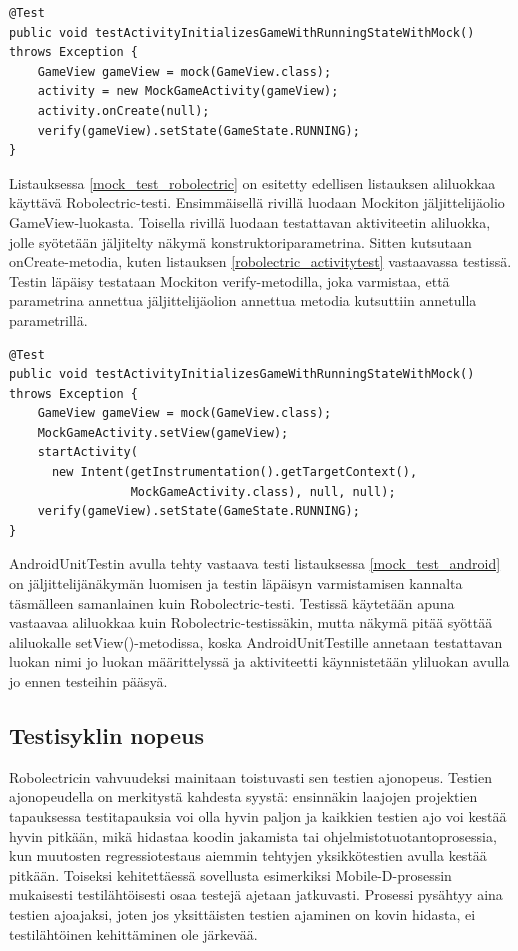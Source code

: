\begin{lstlisting}[float,label=mock_test_robolectric, caption=Jäljittelyä käyttävä testi Robolectrcicillä]
@Test
public void testActivityInitializesGameWithRunningStateWithMock() throws Exception {
	GameView gameView = mock(GameView.class);
	activity = new MockGameActivity(gameView);
	activity.onCreate(null);
	verify(gameView).setState(GameState.RUNNING);
}
\end{lstlisting}

Listauksessa \ref{mock_test_robolectric} on esitetty edellisen listauksen aliluokkaa käyttävä Robolectric-testi. Ensimmäisellä rivillä luodaan Mockiton jäljittelijäolio GameView-luokasta. Toisella rivillä luodaan testattavan aktiviteetin aliluokka, jolle syötetään jäljitelty näkymä konstruktoriparametrina. Sitten kutsutaan onCreate-metodia, kuten listauksen \ref{robolectric_activitytest} vastaavassa testissä. Testin läpäisy testataan Mockiton verify-metodilla, joka varmistaa, että parametrina annettua jäljittelijäolion annettua metodia kutsuttiin annetulla parametrillä.

\begin{lstlisting}[float,label=mock_test_android, caption=Jäljittelyä käyttävä testi AndroidUnitTestillä]
@Test
public void testActivityInitializesGameWithRunningStateWithMock() throws Exception {
	GameView gameView = mock(GameView.class);
	MockGameActivity.setView(gameView);
	startActivity(
	  new Intent(getInstrumentation().getTargetContext(), 
	             MockGameActivity.class), null, null);
	verify(gameView).setState(GameState.RUNNING);
}
\end{lstlisting}

AndroidUnitTestin avulla tehty vastaava testi listauksessa \ref{mock_test_android} on jäljittelijänäkymän luomisen ja testin läpäisyn varmistamisen kannalta täsmälleen samanlainen kuin Robolectric-testi. Testissä käytetään apuna vastaavaa aliluokkaa kuin Robolectric-testissäkin, mutta näkymä pitää syöttää aliluokalle setView()-metodissa, koska AndroidUnitTestille annetaan testattavan luokan nimi jo luokan määrittelyssä ja aktiviteetti käynnistetään yliluokan avulla jo ennen testeihin pääsyä.

\subsection{Testisyklin nopeus}

Robolectricin vahvuudeksi mainitaan toistuvasti sen testien ajonopeus. Testien ajonopeudella on merkitystä kahdesta syystä: ensinnäkin laajojen projektien tapauksessa testitapauksia voi olla hyvin paljon ja kaikkien testien ajo voi kestää hyvin pitkään, mikä hidastaa koodin jakamista tai ohjelmistotuotantoprosessia, kun muutosten regressiotestaus aiemmin tehtyjen yksikkötestien avulla kestää pitkään. Toiseksi kehitettäessä sovellusta esimerkiksi Mobile-D-prosessin mukaisesti testilähtöisesti osaa testejä ajetaan jatkuvasti. Prosessi pysähtyy aina testien ajoajaksi, joten jos yksittäisten testien ajaminen on kovin hidasta, ei testilähtöinen kehittäminen ole järkevää.

